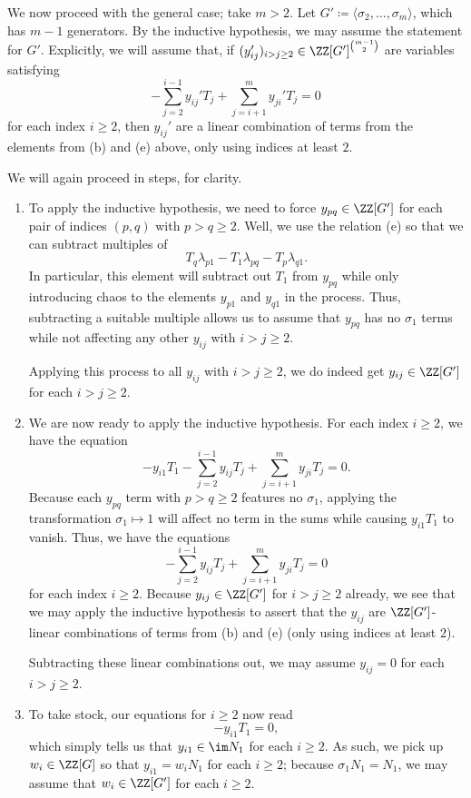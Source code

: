 \documentclass{article}
\numberwithin{equation}{section}
\begin{document}
We now proceed with the general case; take $m>2$. Let $G'\coloneqq\langle\sigma_2,\ldots,\sigma_m\rangle$, which has $m-1$ generators. By the inductive hypothesis, we may assume the statement for $G'$. Explicitly, we will assume that, if $(y_{ij}')_{i>j\ge2}\in\ZZ[G']^{\binom{m-1}2}$ are variables satisfying
\[-\sum_{j=2}^{i-1}y_{ij}'T_j+\sum_{j=i+1}^my_{ji}'T_j=0\]
for each index $i\ge2$, then $y_{ij}'$ are a linear combination of terms from the elements from (b) and (e) above, only using indices at least $2$.

We will again proceed in steps, for clarity.
\begin{enumerate}
	\item To apply the inductive hypothesis, we need to force $y_{pq}\in\ZZ[G']$ for each pair of indices $(p,q)$ with $p>q\ge2$. Well, we use the relation (e) so that we can subtract multiples of
	\[T_q\lambda_{p1}-T_1\lambda_{pq}-T_p\lambda_{q1}.\]
	In particular, this element will subtract out $T_1$ from $y_{pq}$ while only introducing chaos to the elements $y_{p1}$ and $y_{q1}$ in the process. Thus, subtracting a suitable multiple allows us to assume that $y_{pq}$ has no $\sigma_1$ terms while not affecting any other $y_{ij}$ with $i>j\ge2$.

	Applying this process to all $y_{ij}$ with $i>j\ge2$, we do indeed get $y_{ij}\in\ZZ[G']$ for each $i>j\ge2$.

	\item We are now ready to apply the inductive hypothesis. For each index $i\ge2$, we have the equation
	\[-y_{i1}T_1-\sum_{j=2}^{i-1}y_{ij}T_j+\sum_{j=i+1}^my_{ji}T_j=0.\]
	Because each $y_{pq}$ term with $p>q\ge2$ features no $\sigma_1$, applying the transformation $\sigma_1\mapsto1$ will affect no term in the sums while causing $y_{i1}T_1$ to vanish. Thus, we have the equations
	\[-\sum_{j=2}^{i-1}y_{ij}T_j+\sum_{j=i+1}^my_{ji}T_j=0\]
	for each index $i\ge2$. Because $y_{ij}\in\ZZ[G']$ for $i>j\ge2$ already, we see that we may apply the inductive hypothesis to assert that the $y_{ij}$ are $\ZZ[G']$-linear combinations of terms from (b) and (e) (only using indices at least $2$).
	
	Subtracting these linear combinations out, we may assume $y_{ij}=0$ for each $i>j\ge2$.

	\item To take stock, our equations for $i\ge2$ now read
	\[-y_{i1}T_1=0,\]
	which simply tells us that $y_{i1}\in\im N_1$ for each $i\ge2$. As such, we pick up $w_i\in\ZZ[G]$ so that $y_{i1}=w_iN_1$ for each $i\ge2$; because $\sigma_1N_1=N_1$, we may assume that $w_i\in\ZZ[G']$ for each $i\ge2$.


\end{enumerate}
\end{document}
